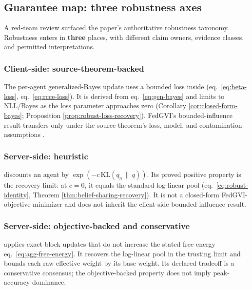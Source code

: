 \documentclass[
  english,
]{article}
\theoremstyle{plain}
\theoremstyle{definition}
\theoremstyle{remark}
\theoremstyle{definition}
\begin{document}
\subsection{Guarantee map: three robustness
axes}\label{sec:robustness-axes}

A red-team review surfaced the paper's authoritative robustness
taxonomy. Robustness enters in \textbf{three} places, with different
claim owners, evidence classes, and permitted interpretations.

\subsubsection{Client-side:
source-theorem-backed}\label{client-side-source-theorem-backed}

The per-agent generalized-Bayes update uses a bounded loss inside
 (eq.~\ref{eq:beta-loss},
eq.~\ref{eq:rcce-loss}). It is derived from eq.~\ref{eq:gen-bayes} and
limits to NLL/Bayes as the loss parameter approaches zero (Corollary
\ref{cor:closed-form-bayes}; Proposition
\ref{prop:robust-loss-recovery}). FedGVI's bounded-influence result
transfers only under the source theorem's loss, model, and contamination
assumptions \citep{mildner2025fedgvi}.

\subsubsection{Server-side: heuristic}\label{server-side-heuristic}

 discounts an agent by
\(\exp(-c\,\mathrm{KL}(q_n \,\|\, q))\). Its proved positive property is
the recovery limit: at \(c=0\), it equals the standard log-linear pool
(eq.~\ref{eq:robust-identity}, Theorem
\ref{thm:belief-sharing-recovery}). It is not a closed-form
FedGVI-objective minimizer and does not inherit the client-side
bounded-influence result.

\subsubsection{Server-side: objective-backed and
conservative}\label{server-side-objective-backed-and-conservative}

 applies exact block updates that do not
increase the stated free energy eq.~\ref{eq:agg-free-energy}. It
recovers the log-linear pool in the trusting limit and bounds each raw
effective weight by its base weight. Its declared tradeoff is a
conservative consensus; the objective-backed property does not imply
peak-accuracy dominance.
\end{document}

